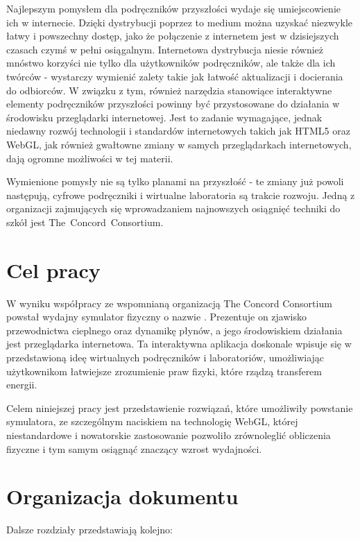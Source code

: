 Najlepszym pomysłem dla podręczników przyszłości wydaje się umiejscowienie ich w
internecie. Dzięki dystrybucji poprzez to medium można uzyskać niezwykle łatwy i
powszechny dostęp, jako że połączenie z internetem jest w dzisiejszych czasach
czymś w pełni osiągalnym. Internetowa dystrybucja niesie również mnóstwo
korzyści nie tylko dla użytkowników podręczników, ale także dla ich twórców -
wystarczy wymienić zalety takie jak łatwość aktualizacji i docierania do
odbiorców. W związku z tym, również narzędzia stanowiące interaktywne elementy
podręczników przyszłości powinny być przystosowane do działania w środowisku
przeglądarki internetowej. Jest to zadanie wymagające, jednak niedawny rozwój
technologii i standardów internetowych takich jak HTML5 oraz WebGL, jak również
gwałtowne zmiany w samych przeglądarkach internetowych, dają ogromne możliwości
w tej materii.

Wymienione pomysły nie są tylko planami na przyszłość - te zmiany już powoli
następują, cyfrowe podręczniki i wirtualne laboratoria są trakcie rozwoju. Jedną
z organizacji zajmujących się wprowadzaniem najnowszych osiągnięć techniki do
szkół jest \mbox{The Concord Consortium}.

\section{Cel pracy}
\label{sec:celPracy}

W wyniku współpracy ze wspomnianą organizacją The Concord Consortium powstał
wydajny symulator fizyczny o nazwie \en. Prezentuje on zjawisko przewodnictwa
cieplnego oraz dynamikę płynów, a jego środowiskiem działania jest
przeglądarka internetowa. Ta interaktywna aplikacja doskonale wpisuje się w
przedstawioną ideę wirtualnych podręczników i laboratoriów, umożliwiając
użytkownikom łatwiejsze zrozumienie praw fizyki, które rządzą transferem
energii.

Celem niniejszej pracy jest przedstawienie rozwiązań, które umożliwiły powstanie
symulatora, ze szczególnym naciskiem na technologię WebGL, której niestandardowe
i nowatorskie zastosowanie pozwoliło zrównoleglić obliczenia fizyczne i tym
samym osiągnąć znaczący wzrost wydajności. 

\section{Organizacja dokumentu}
\label{sec:organizacjaDokumentu}

Dalsze rozdziały przedstawiają kolejno:

